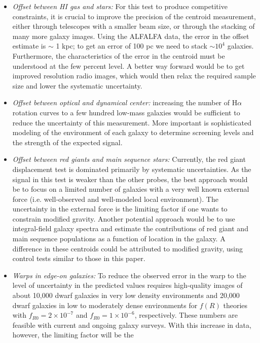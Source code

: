 \documentclass[useAMS,usenatbib,twocolumn]{mn2e}
\newcommand{\ha}{H$\alpha$}
\begin{document}
\begin{itemize}
\item {\it Offset between HI gas and stars:}
  For this test to produce competitive constraints, it is crucial to improve
  the precision of the centroid measurement, either through telescopes with
  a smaller beam size, or through the stacking of many more galaxy images.
  Using the ALFALFA data, the error in the offset estimate is $\sim$ 1 kpc;
  to get an error of 100 pc we need to stack $\sim 10^{4}$
  galaxies.  Furthermore, the characteristics of the error
  in the centroid must be understood at the few percent level. A better way forward
  would be to get improved resolution radio images, which would then relax
  the required sample size and lower the systematic uncertainty. 
\item {\it Offset between optical and dynamical center:}
  increasing the number of \ha~ rotation curves to a few hundred 
  low-mass galaxies would be sufficient to reduce the uncertainty of
  this measurement.  More important is sophisticated
  modeling of the environment of each galaxy to determine screening levels and
  the strength of the expected signal.
\item {\it Offset between red giants and main sequence stars:}
  Currently, the red giant displacement test is dominated primarily by
  systematic uncertainties. As the signal in this test is weaker than the
  other probes, the best approach would be to focus on a limited number
  of galaxies with a very well known external force (i.e. well-observed and
  well-modeled local environment). The uncertainty in the external force is the
  limiting factor if one wants to constrain modified gravity.  Another potential
  approach would be to use integral-field galaxy spectra and estimate the
  contributions of red giant and main sequence populations as a function of
  location in the galaxy.  A difference in these centroids could be
  attributed to modified gravity, using control tests similar to those in
  this paper.
\item {\it Warps in edge-on galaxies:}
  To reduce the observed error in the warp to the level of uncertainty in the 
  predicted values requires high-quality images
  of about 10,000 dwarf galaxies in very low density environments and 20,000
  dwarf galaxies in low to moderately dense environments for $f(R)$ theories
  with $f_{R0} = 2\times10^{-7}$ and $f_{R0} = 1\times10^{-6}$, respectively.
  These numbers are feasible with  current and ongoing galaxy surveys.
  With this increase in data, however, the limiting factor will be the

\end{itemize}
\end{document}
